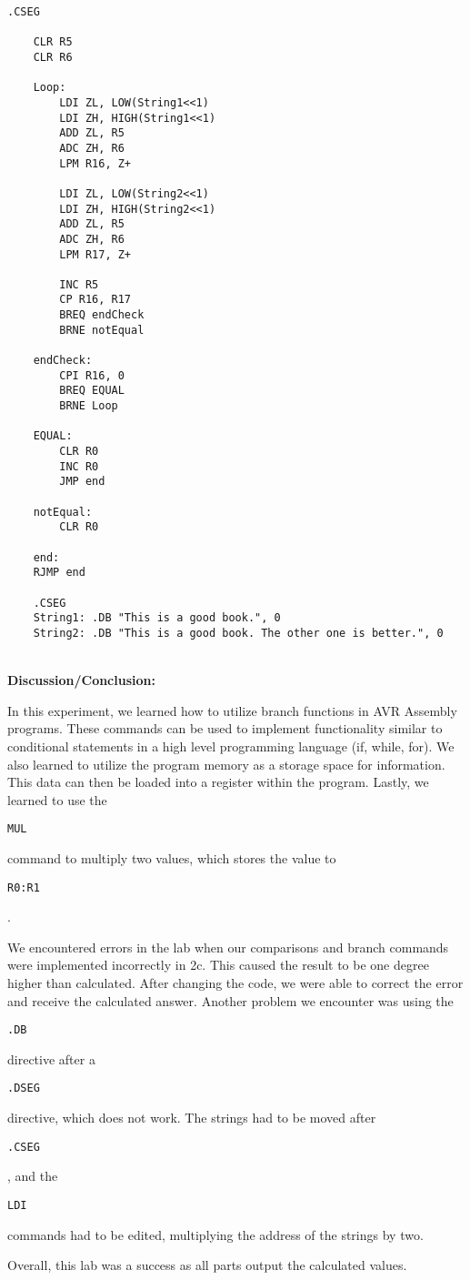\documentclass[titlepage, 12pt]{article}
\newcommand{\ttt}[1]{\begin{small}\texttt{#1}\end{small}}
\begin{document}
	\begin{lstlisting}[style=AVR]
	.CSEG 
	
	CLR R5 
	CLR R6 
	
	Loop: 
		LDI ZL, LOW(String1<<1) 
		LDI ZH, HIGH(String1<<1) 
		ADD ZL, R5 
		ADC ZH, R6 
		LPM R16, Z+ 
		
		LDI ZL, LOW(String2<<1) 
		LDI ZH, HIGH(String2<<1) 
		ADD ZL, R5 
		ADC ZH, R6 
		LPM R17, Z+ 
		
		INC R5 
		CP R16, R17 
		BREQ endCheck 
		BRNE notEqual 
	
	endCheck: 
		CPI R16, 0 
		BREQ EQUAL 
		BRNE Loop 
	
	EQUAL: 
		CLR R0 
		INC R0 
		JMP end 
	
	notEqual: 
		CLR R0 
	
	end: 
	RJMP end 
	
	.CSEG 
	String1: .DB "This is a good book.", 0 
	String2: .DB "This is a good book. The other one is better.", 0
	\end{lstlisting}~\\
	
	\noindent\large{\textbf{Discussion/Conclusion:}} 
	
	In this experiment, we learned how to utilize branch functions in AVR Assembly programs. These commands can be used to implement functionality similar to conditional statements in a high level programming language (if, while, for). We also learned to utilize the program memory as a storage space for information. This data can then be loaded into a register within the program. Lastly, we learned to use the \ttt{MUL} command to multiply two values, which stores the value to \ttt{R0:R1}.
	
	We encountered errors in the lab when our comparisons and branch commands were implemented incorrectly in 2c. This caused the result to be one degree higher than calculated. After changing the code, we were able to correct the error and receive the calculated answer. Another problem we encounter was using the \ttt{.DB} directive after a \ttt{.DSEG} directive, which does not work. The strings had to be moved after \ttt{.CSEG}, and the \ttt{LDI} commands had to be edited, multiplying the address of the strings by two.
	
	Overall, this lab was a success as all parts output the calculated values.
	
\end{document}
